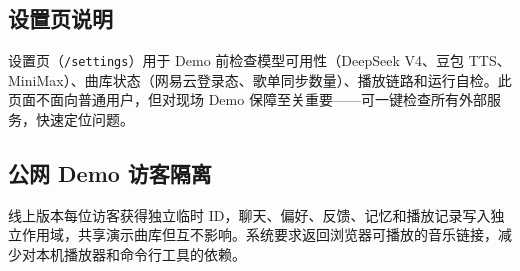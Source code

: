 \documentclass[UTF8,a4paper,11pt,fontset=windows]{ctexart}
\begin{document}
\subsection{设置页说明}

设置页（\texttt{/settings}）用于 Demo 前检查模型可用性（DeepSeek V4、豆包 TTS、MiniMax）、曲库状态（网易云登录态、歌单同步数量）、播放链路和运行自检。此页面不面向普通用户，但对现场 Demo 保障至关重要——可一键检查所有外部服务，快速定位问题。

\subsection{公网 Demo 访客隔离}

线上版本每位访客获得独立临时 ID，聊天、偏好、反馈、记忆和播放记录写入独立作用域，共享演示曲库但互不影响。系统要求返回浏览器可播放的音乐链接，减少对本机播放器和命令行工具的依赖。
\end{document}

